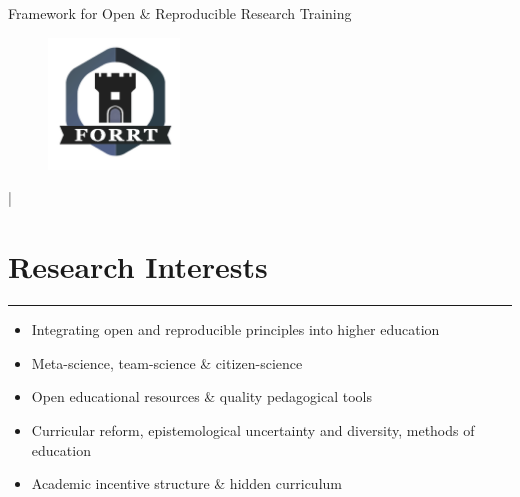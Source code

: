 \documentclass[letterpaper]{article}
\def\name{Framework for Open \& Reproducible Research Training}
\newcommand{\MYhref}[3][Gray]{\href{#2}{\color{#1}{#3}}}%
\begin{document}
\centerline{\selectfont\huge \name}


\begin{figure}
    \centering
    \includegraphics[width=3.5cm]{FORRT.png}
\end{figure}


\begin{center}
    \large \color{Gray}
\vspace{-0.5em}
\item
\hspace{-1.5em} \MYhref{mailto:info@forrt.org}{info@forrt.org} | \MYhref{https://forrt.org/}{forrt.org}
\end{center}









\section*{\color{Brown}Research Interests}
\vspace{-.5em}
\hrule
\vspace{1em}

\begin{itemize}
\item Integrating open and reproducible principles into higher education
\item Meta-science, team-science \& citizen-science
\item Open educational resources \& quality pedagogical tools
\item Curricular reform, epistemological uncertainty and diversity, methods of education
\item Academic incentive structure  \& hidden curriculum
\end{itemize}
\end{document}
